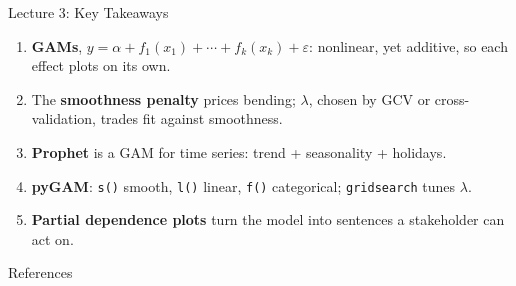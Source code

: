 \documentclass[aspectratio=169, 11pt]{beamer}
\begin{document}
\begin{frame}{Lecture 3: Key Takeaways}
  \begin{keybox}
    {\small
    \begin{enumerate}
      \item \textbf{GAMs}, $y = \alpha + f_1(x_1) + \cdots + f_k(x_k) + \varepsilon$: nonlinear,
            yet additive, so each effect plots on its own.
      \item The \textbf{smoothness penalty} prices bending; $\lambda$, chosen by GCV or
            cross-validation, trades fit against smoothness.
      \item \textbf{Prophet} is a GAM for time series: trend + seasonality + holidays.
      \item \textbf{pyGAM}: \texttt{s()} smooth, \texttt{l()} linear, \texttt{f()} categorical;
            \texttt{gridsearch} tunes $\lambda$.
      \item \textbf{Partial dependence plots} turn the model into sentences a stakeholder can
            act on.
    \end{enumerate}
    }
  \end{keybox}
\end{frame}

\begin{frame}[allowframebreaks]{References}
  \printbibliography[heading=none]
\end{frame}

\end{document}
